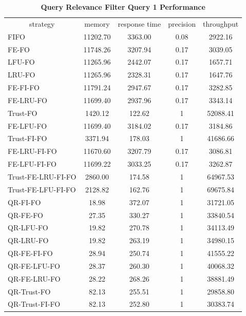 \begin{table}[!htbp]
	\centering
    \caption{\textbf{Query Relevance Filter Query 1 Performance}}
    \label{tab:6-qrp}
    \begin{tabular}{|l||c|c|c|c|} \hline
         \multicolumn{1}{|c||}{strategy} & memory & response time & precision & throughput \\ \hhline{|=#=|=|=|=|}
FIFO             & 11202.70 & 3363.00 & 0.08 & 2922.16\\ \hline 
FE-FO             & 11748.26 & 3207.94 & 0.17 & 3039.05\\ \hline 
LFU-FO            & 11265.96 & 2442.07 & 0.17 & 1657.71\\ \hline 
LRU-FO            & 11265.96 & 2328.31 & 0.17 & 1647.76\\ \hline 
FE-FI-FO           & 11791.24 & 2947.67 & 0.17 & 3282.85\\ \hline 
FE-LRU-FO          & 11699.40 & 2937.96 & 0.17 & 3343.14\\ \hline 
Trust-FO          & 1420.12 & 122.62 & 1 & 52088.41\\ \hline 
FE-LFU-FO          & 11699.40 & 3184.02 & 0.17 & 3184.86\\ \hline 
Trust-FI-FO        & 3371.94 & 178.03 & 1 & 41686.66\\ \hline 
FE-LRU-FI-FO        & 11670.60 & 3207.79 & 0.17 & 3086.81\\ \hline 
FE-LFU-FI-FO        & 11699.22 & 3033.25 & 0.17 & 3262.87\\ \hline 
Trust-FE-LRU-FI-FO   & 2860.00 & 174.58 & 1 & 64967.53\\ \hline 
Trust-FE-LFU-FI-FO   & 2128.82 & 162.76 & 1 & 69675.84\\ \hhline{|=#=|=|=|=|}
QR-FI-FO           & 18.98 & 372.07 & 1 & 31721.05\\ \hline 
QR-FE-FO           & 27.35 & 330.27 & 1 & 33840.54\\ \hline 
QR-LFU-FO          & 19.82 & 270.78 & 1 & 34113.49\\ \hline 
QR-LRU-FO          & 19.82 & 263.19 & 1 & 34980.15\\ \hline 
QR-FE-FI-FO         & 28.94 & 250.74 & 1 & 41555.22\\ \hline 
QR-FE-LFU-FO        & 28.37 & 260.30 & 1 & 40068.32\\ \hline 
QR-FE-LRU-FO        & 28.22 & 268.26 & 1 & 38881.49\\ \hline 
QR-Trust-FO        & 82.13 & 255.51 & 1 & 29858.80\\ \hline 
QR-Trust-FI-FO      & 82.13 & 252.80 & 1 & 30383.74\\ \hline 

\end{tabular}
\end{table}
